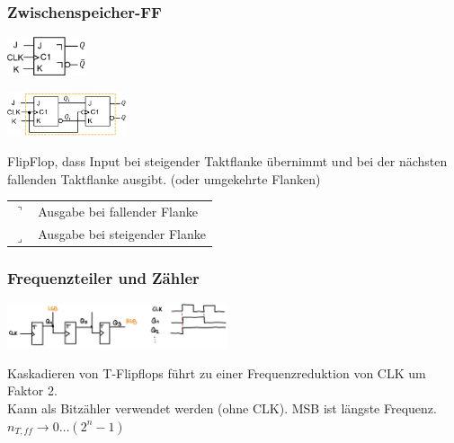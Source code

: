 \subsubsection{Zwischenspeicher-FF}
\begin{center}
    \begin{minipage}[c]{0.4\linewidth}
        \includegraphics[width = 23mm]{images/zs_ff.jpeg}
    \end{minipage}
    \hfill
    \begin{minipage}[c]{0.55\linewidth}
        \includegraphics[width = 35mm]{images/zs_ff_cir.jpeg}
    \end{minipage}
\end{center}
FlipFlop, dass Input bei steigender Taktflanke übernimmt und bei der nächsten fallenden Taktflanke ausgibt. (oder umgekehrte Flanken)
\begin{flushleft}
    \begin{tabular}{c l}
        $\urcorner$ & Ausgabe bei fallender Flanke\\
        $\lrcorner$ & Ausgabe bei steigender Flanke\\
    \end{tabular}
\end{flushleft}

\subsubsection{Frequenzteiler und Zähler}
\begin{center}
    \includegraphics[width = 65mm]{images/counter.jpeg}
\end{center}
Kaskadieren von T-Flipflops führt zu einer Frequenzreduktion von CLK um Faktor 2.\\
Kann als Bitzähler verwendet werden (ohne CLK). MSB ist längste Frequenz. $n_{T,ff} \rightarrow 0\dots (2^n -1)$